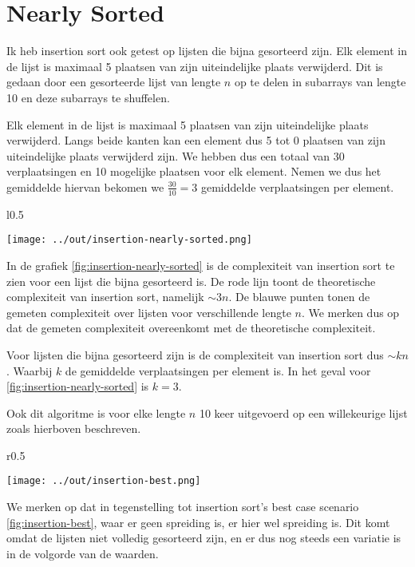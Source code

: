 \documentclass[a4paper]{article}
\begin{document}
\section{Nearly Sorted}
Ik heb insertion sort ook getest op lijsten die bijna gesorteerd zijn. Elk element in de lijst is maximaal 5 plaatsen van zijn uiteindelijke plaats verwijderd.
Dit is gedaan door een gesorteerde lijst van lengte $n$ op te delen in subarrays van lengte 10 en deze subarrays te shuffelen.
\par
Elk element in de lijst is maximaal 5 plaatsen van zijn uiteindelijke plaats verwijderd.
Langs beide kanten kan een element dus 5 tot 0 plaatsen van zijn uiteindelijke plaats verwijderd zijn.
We hebben dus een totaal van 30 verplaatsingen en 10 mogelijke plaatsen voor elk element.
Nemen we dus het gemiddelde hiervan bekomen we $\frac{30}{10}=3$ gemiddelde verplaatsingen per element.

\begin{wrapfigure}{l}{0.5\textwidth}
  \begin{center}
    \texttt{[image: ../out/insertion-nearly-sorted.png]}
  \end{center}
  \caption{Nearly Sorted}
  \label{fig:insertion-nearly-sorted}
\end{wrapfigure}\hfill
\par
In de grafiek \ref{fig:insertion-nearly-sorted} is de complexiteit van insertion sort te zien voor een lijst die bijna gesorteerd is.
De rode lijn toont de theoretische complexiteit van insertion sort, namelijk $\sim 3n$.
De blauwe punten tonen de gemeten complexiteit over lijsten voor verschillende lengte $n$.
We merken dus op dat de gemeten complexiteit overeenkomt met de theoretische complexiteit.
\par
Voor lijsten die bijna gesorteerd zijn is de complexiteit van insertion sort dus $\sim kn$.
Waarbij $k$ de gemiddelde verplaatsingen per element is. In het geval voor \ref{fig:insertion-nearly-sorted} is $k=3$.
\par
Ook dit algoritme is voor elke lengte $n$ 10 keer uitgevoerd op een willekeurige lijst zoals hierboven beschreven.

\begin{wrapfigure}{r}{0.5\textwidth}
  \begin{center}
    \texttt{[image: ../out/insertion-best.png]}
  \end{center}
  \caption{Best case}
  \label{fig:insertion-best}
\end{wrapfigure}

We merken op dat in tegenstelling tot insertion sort's best case scenario \ref{fig:insertion-best}, waar er geen spreiding is, er hier wel spreiding is.
Dit komt omdat de lijsten niet volledig gesorteerd zijn, en er dus nog steeds een variatie is in de volgorde van de waarden.
\end{document}
